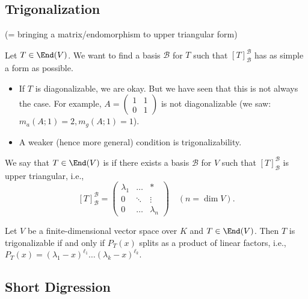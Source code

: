 \subsection{Trigonalization}
(= bringing a matrix/endomorphism to upper triangular form)

\begin{question}\label{q:trig_basis}
  Let $T \in \End(V)$. We want to find a basis $\mathcal{B}$ for $T$ such that $[T]_{\mathcal{B}}^{\mathcal{B}}$ has as simple a form as possible.
\end{question}
\begin{itemize}
  \item If $T$ is diagonalizable, we are okay. But we have seen that this is not always the case. For example, $A = \left(\begin{smallmatrix} 1 & 1 \\ 0 & 1 \end{smallmatrix}\right)$ is not diagonalizable (we saw: $m_a(A; 1) = 2, m_g(A; 1) = 1$).
  \item A weaker (hence more general) condition is trigonalizability.
\end{itemize}

\begin{definition} \label{def:trigonalizable}
  We say that $T \in \End(V)$ is  if there exists a basis $\mathcal{B}$ for $V$ such that $[T]_{\mathcal{B}}^{\mathcal{B}}$ is upper triangular, i.e.,
  \begin{equation} \label{eq:upper_triangular_def}
    [T]_{\mathcal{B}}^{\mathcal{B}} = \begin{pmatrix} \lambda_1 & \dots & * \\ 0 & \ddots & \vdots \\ 0 & \dots & \lambda_n \end{pmatrix} \quad (n = \dim V).
  \end{equation}
\end{definition}

\begin{theorem} \label{thm:trig_condition}
  Let $V$ be a finite-di\-men\-sional vector space over $K$ and $T \in \End(V)$. Then $T$ is trigonalizable if and only if $P_T(x)$ splits as a product of linear factors, i.e., $P_T(x) = (\lambda_1 - x)^{\ell_1} \dots (\lambda_k - x)^{\ell_k}$.
\end{theorem}

\subsection*{Short Digression}

